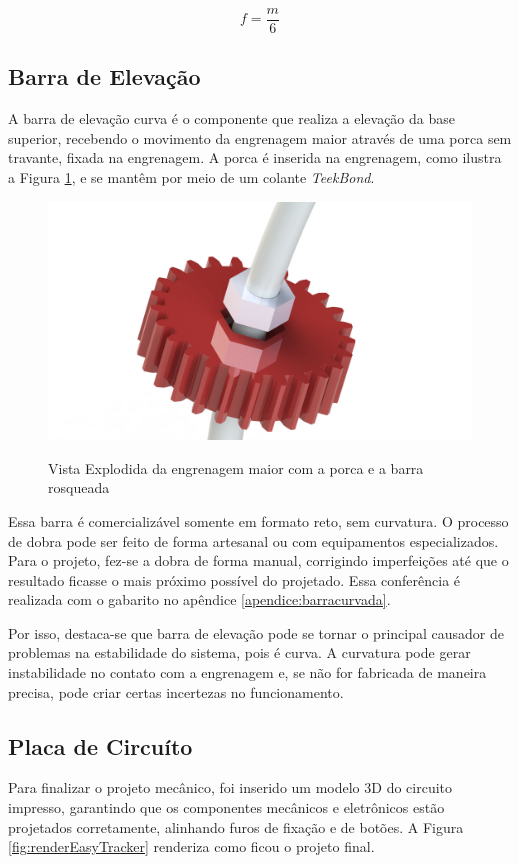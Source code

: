 \begin{equation}
	f = \dfrac{m}{6}
	\label{eq:f}
\end{equation}


\subsection{Barra de Elevação}

A barra de elevação curva é o componente que realiza a elevação da base superior, recebendo o movimento da engrenagem maior através de uma porca sem travante, fixada na engrenagem. A porca é inserida na engrenagem, como ilustra a Figura \ref{fig:explosao}, e se mantêm por meio de um colante \textit{TeekBond}. 

\begin{figure}[htb]
	\centering
	\caption{Vista Explodida da engrenagem maior com a porca e a barra rosqueada}
	\includegraphics[width=0.6\linewidth]{figuras/desPlataforma/explosao}
	\label{fig:explosao}
\end{figure}

Essa barra é comercializável somente em formato reto, sem curvatura. O processo de dobra pode ser feito de forma artesanal ou com equipamentos especializados. Para o projeto, fez-se a dobra de forma manual, corrigindo imperfeições até que o resultado ficasse o mais próximo possível do projetado. Essa conferência é realizada com o gabarito no apêndice \ref{apendice:barracurvada}. 


Por isso, destaca-se que barra de elevação pode se tornar o principal causador de problemas na estabilidade do sistema, pois é curva. A curvatura pode gerar instabilidade no contato com a engrenagem e, se não for fabricada de maneira precisa, pode criar certas incertezas no funcionamento. 

\subsection{Placa de Circuíto}
Para finalizar o projeto mecânico, foi inserido um modelo 3D do circuito impresso, garantindo que os componentes mecânicos e eletrônicos estão projetados corretamente, alinhando furos de fixação e de botões. A Figura \ref{fig:renderEasyTracker} renderiza como ficou o projeto final.

